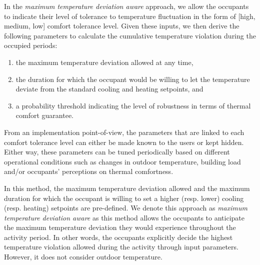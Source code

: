 In the \emph{\textsl{maximum temperature deviation aware}} approach, we allow the occupants to indicate their level of tolerance to temperature fluctuation in the form of [high, medium, low] comfort tolerance level. Given these inputs, we then derive the following parameters to calculate the cumulative temperature violation during the occupied periods:
\begin{enumerate}	
	\item the maximum temperature deviation allowed at any time, 
	\item the duration for which the occupant would be willing to let the temperature deviate from the standard cooling and heating setpoints, and
	\item a probability threshold indicating the level of robustness in terms of thermal comfort guarantee.
\end{enumerate}
From an implementation point-of-view, the parameters that are linked to each comfort tolerance level can either be made known to the users or kept hidden. Either way, these parameters can be tuned periodically based on different operational conditions such as changes in outdoor temperature, building load and/or occupants' perceptions on thermal comfortness.

In this method, the maximum temperature deviation allowed and the maximum duration for which the occupant is willing to set a higher (resp. lower) cooling (resp. heating) setpoints are pre-defined. We denote this approach as \emph{\textsl{maximum temperature deviation aware}} as this method allows the occupants to anticipate the maximum temperature deviation they would experience throughout the activity period. In other words, the occupants explicitly decide the highest temperature violation allowed during the activity through input parameters. However, it does not consider outdoor temperature. 

